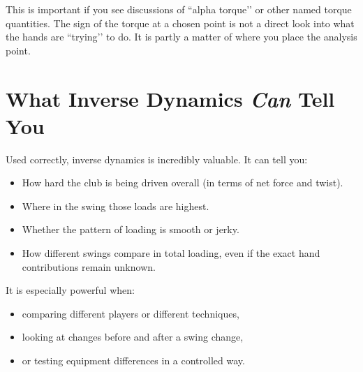 \documentclass[12pt]{article}
\begin{document}
\begin{center}
\end{center}

This is important if you see discussions of ``alpha torque’’ or other named torque quantities.  
The sign of the torque at a chosen point is not a direct look into what the hands are ``trying’’ to do.  
It is partly a matter of where you place the analysis point.

\section{What Inverse Dynamics \emph{Can} Tell You}

Used correctly, inverse dynamics is incredibly valuable.  
It can tell you:

\begin{itemize}
    \item How hard the club is being driven overall (in terms of net force and twist).
    \item Where in the swing those loads are highest.
    \item Whether the pattern of loading is smooth or jerky.
    \item How different swings compare in total loading, even if the exact hand contributions remain unknown.
\end{itemize}

It is especially powerful when:
\begin{itemize}
    \item comparing different players or different techniques,
    \item looking at changes before and after a swing change,
    \item or testing equipment differences in a controlled way.
\end{itemize}
\end{document}
